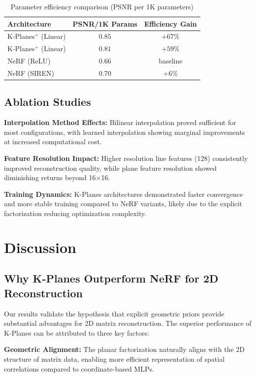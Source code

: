 \documentclass{article}
\begin{document}
\begin{table}[htbp]
\centering
\caption{Parameter efficiency comparison (PSNR per 1K parameters)}
\label{tab:efficiency}
\begin{tabular}{@{}lcc@{}}
\toprule
Architecture & PSNR/1K Params & Efficiency Gain \\
\midrule
K-Planes$^\times$ (Linear) & $0.85$ & $+67\%$ \\
K-Planes$^+$ (Linear) & $0.81$ & $+59\%$ \\
NeRF (ReLU) & $0.66$ & baseline \\
NeRF (SIREN) & $0.70$ & $+6\%$ \\
\bottomrule
\end{tabular}
\end{table}

\subsection{Ablation Studies}

\textbf{Interpolation Method Effects:} Bilinear interpolation proved sufficient for most configurations, with learned interpolation showing marginal improvements at increased computational cost.

\textbf{Feature Resolution Impact:} Higher resolution line features (128) consistently improved reconstruction quality, while plane feature resolution showed diminishing returns beyond 16×16.

\textbf{Training Dynamics:} K-Planes architectures demonstrated faster convergence and more stable training compared to NeRF variants, likely due to the explicit factorization reducing optimization complexity.

\section{Discussion}

\subsection{Why K-Planes Outperform NeRF for 2D Reconstruction}

Our results validate the hypothesis that explicit geometric priors provide substantial advantages for 2D matrix reconstruction. The superior performance of K-Planes can be attributed to three key factors:

\textbf{Geometric Alignment:} The planar factorization naturally aligns with the 2D structure of matrix data, enabling more efficient representation of spatial correlations compared to coordinate-based MLPs.
\end{document}
